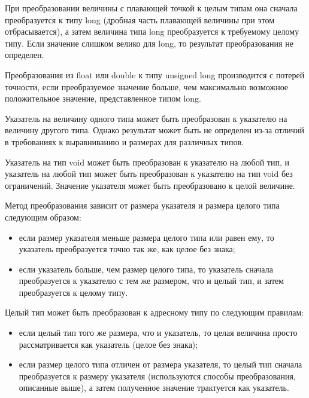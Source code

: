 При преобразовании величины с плавающей точкой к целым типам она сначала преобразуется к типу long (дробная часть плавающей величины при этом отбрасывается), а затем величина типа long преобразуется к требуемому целому типу. Если значение слишком велико для long, то результат преобразования не определен. 

Преобразования из float или double к типу unsigned long производится с потерей точности, если преобразуемое значение больше, чем максимально возможное положительное значение, представленное типом long. \killoverfullbefore \BL 

 \BL

Указатель на величину одного типа может быть преобразован к указателю на величину другого типа. Однако результат может быть не определен из-за отличий в требованиях к выравниванию и размерах для различных типов. \killoverfullbefore

Указатель на тип void может быть преобразован к указателю на любой тип, и указатель на любой тип может быть преобразован к указателю на тип void без ограничений. Значение указателя может быть преобразовано к целой величине. \killoverfullbefore

Метод преобразования зависит от размера указателя и размера целого типа следующим образом: 
\begin{itemize}
\item если размер указателя меньше размера целого типа или равен ему, то указатель преобразуется точно так же, как целое без знака;
\item если указатель больше, чем размер целого типа, то указатель сначала преобразуется к указателю с тем же размером, что и целый тип, и затем преобразуется к целому типу. \killoverfullbefore \BL
\end{itemize}

Целый тип может быть преобразован к адресному типу по следующим правилам: 
\begin{itemize}
\item если целый тип того же размера, что и указатель, то целая величина просто рассматривается как указатель (целое без знака);
\item если размер целого типа отличен от размера указателя, то целый тип сначала преобразуется к размеру указателя (используются способы преобразования, описанные выше), а затем полученное значение трактуется как указатель.\killoverfullbefore \BL 
\end{itemize}

